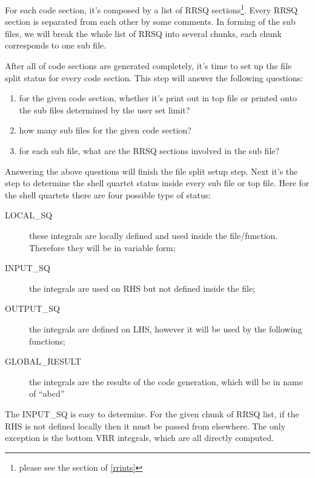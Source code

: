 For each code section, it's composed by a list of RRSQ sections\footnote{please
see the section of \ref{rrints}}. Every RRSQ section is separated from 
each other by some comments. In forming of the sub files, we will break
the whole list of RRSQ into several chunks, each chunk corresponds to 
one sub file.

After all of code sections are generated completely, it's time to set up the 
file split status for every code section. This step will answer the following 
questions:
\begin{enumerate}
  \item for the given code section, whether it's print out in top file or printed 
 onto the sub files determined by the user set limit?
 \item how many sub files for the given code section? 
 \item for each sub file, what are the RRSQ sections involved in the sub file?
\end{enumerate}

Answering the above questions will finish the file split setup step. Next it's the step
to determine the shell quartet status inside every sub file or top file. Here for the 
shell quartets there are four possible type of status:
\begin{description}
 \item [LOCAL\_SQ] these integrals are locally defined and used inside the file/function.
 Therefore they will be in variable form;
 \item [INPUT\_SQ] the integrals are used on RHS but not defined inside the file;
 \item [OUTPUT\_SQ] the integrals are defined on LHS, however it will be used by the 
 following functions;
 \item [GLOBAL\_RESULT] the integrals are the results of the code generation, which will be 
 in name of ``abcd''
\end{description}

The INPUT\_SQ is easy to determine. For the given chunk of RRSQ list, if the RHS is not defined
locally then it must be passed from elsewhere. The only exception is the bottom VRR integrals,
which are all directly computed.

